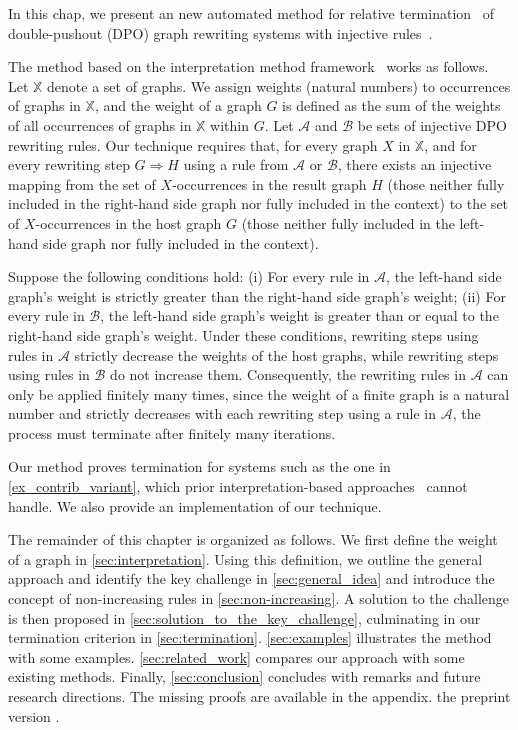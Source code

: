 
In this chap, we present an new automated method for relative termination~\cite{geser1990relative} of double-pushout (DPO) graph rewriting systems with injective rules~\cite{corradini1997algebraic,habel2001double,konig2018atutorial}. 

The method based on the interpretation method framework~\cite{nipkow1998term} works as follows. Let \( \mathbb{X} \) denote a set of graphs. We assign weights (natural numbers) to occurrences of graphs in \( \mathbb{X} \), and the weight of a graph $G$ is defined as the sum of the weights of all occurrences of graphs in \( \mathbb{X} \) within $G$. Let $\mathcal{A}$ and $\mathcal{B}$ be sets of injective DPO rewriting rules. Our technique requires that, for every graph $X$ in $\mathbb{X}$, and for every rewriting step $G \Rightarrow H$ using a rule from $\mathcal{A}$ or $\mathcal{B}$, there exists an injective mapping from the set of \( X \)-occurrences in the result graph $H$
(those neither fully included in the right-hand side graph nor fully included in the context)
 to the set of \( X \)-occurrences in the host graph $G$ (those neither fully included in the left-hand side graph nor fully included in the context).   

Suppose the following conditions hold: (i) For every rule in \( \mathcal{A} \), the left-hand side graph's weight is strictly greater than the right-hand side graph's weight; (ii) For every rule in \( \mathcal{B} \), the left-hand side graph's weight is greater than or equal to the right-hand side graph's weight. 
Under these conditions, rewriting steps using rules in \( \mathcal{A} \) strictly decrease the weights of the host graphs, while rewriting steps using rules in \( \mathcal{B} \) do not increase them.
Consequently, the rewriting rules in \( \mathcal{A} \) can only be applied finitely many times, since the weight of a finite graph is a natural number and strictly decreases with each rewriting step using a rule in \( \mathcal{A} \), the process must terminate after finitely many iterations.  

Our method proves termination for systems such as the one in \autoref{ex_contrib_variant}, which prior interpretation-based approaches~\cite{zantema2014termination,bruggink2014termination,bruggink2015proving,
endrullis2024generalized_arxiv_v2,
overbeek2024termination_lmcs} cannot handle. 
We also provide an implementation of our technique.  
   
The remainder of this chapter is organized as follows.
We first define the weight of a graph in \autoref{sec:interpretation}. 
Using this definition, we outline the general approach and identify the key challenge in \autoref{sec:general_idea} and introduce the concept of non-increasing rules in \autoref{sec:non-increasing}. 
A solution to the challenge is then proposed in \autoref{sec:solution_to_the_key_challenge}, culminating in our termination criterion in \autoref{sec:termination}.
\autoref{sec:examples} illustrates the method with some examples.
\autoref{sec:related_work} compares our approach with some existing methods.
Finally, \autoref{sec:conclusion} concludes with remarks and future research directions. The missing proofs are available in 
\iflongversion
the appendix.
\else
the preprint version \cite{qiu2025termination}.
\fi